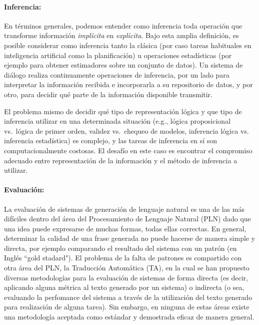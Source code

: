   \paragraph{Inferencia:} En t\'erminos generales, podemos entender como
  inferencia toda operaci\'on que transforme informaci\'on \textit{impl\'icita} en
  \textit{expl\'icita}.  Bajo esta amplia definici\'on, es posible considerar como
  inferencia tanto la cl\'asica (por caso
  tareas habituales en inteligencia artificial como la planificaci\'on) u operaciones estad\'isticas (por ejemplo para obtener estimadores sobre un conjunto de datos).  Un sistema de di\'alogo realiza continuamente operaciones de inferencia, por un lado   para interpretar la informaci\'on recibida e incorporarla a su repositorio de datos, y por otro, para decidir qu\'e parte de la informaci\'on disponible transmitir.

  El problema mismo de decidir qu\'e tipo de representaci\'on l\'ogica y que tipo de inferencia utilizar en una determinada situaci\'on (e.g., l\'ogica proposicional vs.\ l\'ogica de primer orden, validez vs.\ chequeo de modelos, inferencia l\'ogica vs. inferencia estad\'istica) es complejo, y las tareas de inferencia en s\'i son computacionalmente costosas.  El desaf\'io en este caso es encontrar el compromiso adecuado entre representaci\'on de la informaci\'on y el m\'etodo de inferencia a utilizar.

\paragraph{Evaluaci\'on:} La evaluaci\'on de sistemas de generaci\'on de lenguaje natural es una de las m\'as dif\'iciles dentro del \'area del Procesamiento de Lenguaje Natural (PLN) dado que una idea puede expresarse de muchas formas, todas ellas correctas. En general, determinar la calidad de una frase generada no puede hacerse de manera simple y directa, por ejemplo comparando el resultado del sistema con un patr\'on (en Ingl\'es ``gold stadard"). El problema de la falta de patrones es compartido con otra \'area del PLN, la Traducci\'on Autom\'atica (TA), en la cual se han propuesto diversas metodolog\'ias para la evaluaci\'on de sistemas de forma directa (es decir, aplicando alguna m\'etrica al texto generado por un sistema) o indirecta (o sea, evaluando la perfomance del sistema a trav\'es de la utilizaci\'on del texto generado para realizaci\'on de alguna tarea). Sin embargo, en ninguna de estas \'areas existe una metodolog\'ia aceptada como est\'andar y demostrada eficaz de manera general.

